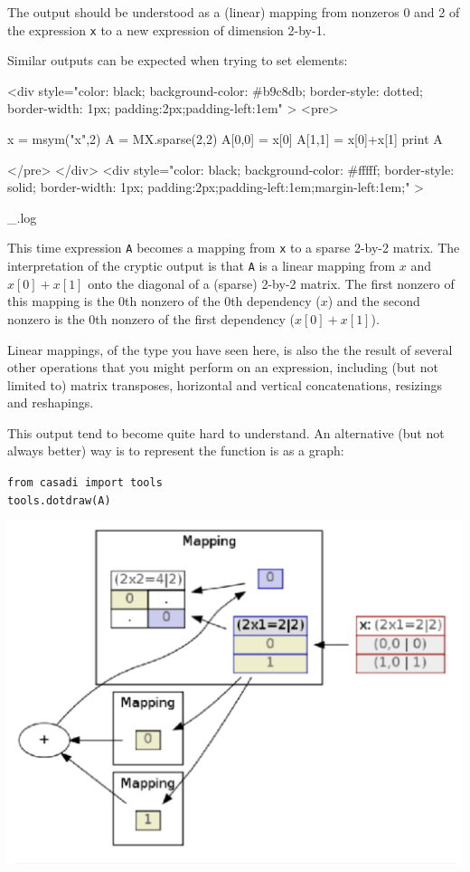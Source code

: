 \documentclass[a4paper,12pt]{book}
\newcounter{pytexcount}
\newcounter{pytexsubcount}
\renewenvironment{pytex}
{\addtocounter{pytexsubcount}{1}%
\begin{rawhtml}
<div style="color: black; background-color: \#b9c8db;  border-style: dotted; border-width: 1px; padding:2px;padding-left:1em" >
<pre>
\end{rawhtml}
}%
{\begin{rawhtml}
</pre>
</div>
<div style="color: black; background-color: \#fffff;  border-style: solid; border-width: 1px; padding:2px;padding-left:1em;margin-left:1em;" >\end{rawhtml}
_\arabic{pytexsubcount}.log}%
\begin{rawhtml}
</div>
\end{rawhtml}
}
\begin{document}
{The output should be understood as a (linear) mapping from nonzeros 0 and 2 of the expression \texttt{x} to a new expression of dimension 2-by-1.

Similar outputs can be expected when trying to set elements:
\begin{pytex}
x = msym("x",2)
A = MX.sparse(2,2)
A[0,0] = x[0]
A[1,1] = x[0]+x[1]
print A
\end{pytex}

This time expression \texttt{A} becomes a mapping from \texttt{x} to a sparse 2-by-2 matrix. The interpretation of the cryptic output is that \texttt{A} is a linear mapping from $x$ and $x[0]+x[1]$ onto the diagonal of a (sparse) 2-by-2 matrix. The first nonzero of this mapping is the 0th nonzero of the 0th dependency ($x$) and the second nonzero is the 0th nonzero of the first dependency ($x[0]+x[1]$). 

Linear mappings, of the type you have seen here, is also the the result of several other operations that you might perform on an expression, including (but not limited to) matrix transposes, horizontal and vertical concatenations, resizings and reshapings.

This output tend to become quite hard to understand. An alternative (but not always better) way is to represent the function is as a graph:

\begin{minipage}[t]{0.45\textwidth}
\texttt{from casadi import tools} \\
\texttt{tools.dotdraw(A)} \\
\end{minipage}
\begin{minipage}[t]{0.45\textwidth}
\begin{center}
\includegraphics[width=\textwidth]{mxdraw}
\end{center}
\end{minipage}

}
\end{document}
